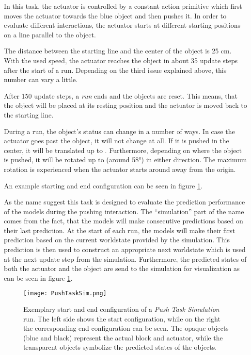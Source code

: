 In this task, the actuator is controlled by a constant action primitive which first moves the actuator towards the blue object and then pushes it.
In order to evaluate different interactions, the actuator starts at different starting positions on a line parallel to the object. 

The distance between the starting line and the center of the object is 25 cm. With the used speed, the actuator reaches the object in about 35 update steps after the start of a run. Depending on the third issue explained above, this number can vary a little.

After 150 update steps, a \textit{run} ends and the objects are reset. This means, that the object will be placed at its resting position and the actuator is moved back to the starting line. 

During a run, the object's status can change in a number of ways. In case the actuator goes past the object, it will not change at all. If it is pushed in the center, it will be translated up to . Furthermore, depending on where the object is pushed, it will be rotated up to  (around 58°) in either direction. 
The maximum rotation is experienced when the actuator starts around  away from the origin.

An example starting and end configuration can be seen in figure \ref{fig:pushTaskSim}. 

As the name suggest this task is designed to evaluate the prediction performance of the models during the pushing interaction. The \enquote{simulation} part of the name comes from the fact, that the models will make consecutive predictions based on their last prediction. At the start of each run, the models will make their first prediction based on the current worldstate provided by the simulation. This prediction is then used to construct an appropriate next worldstate which is used at the next update step from the simulation.
Furthermore, the predicted states of both the actuator and the object are send to the simulation for visualization as can be seen in figure \ref{fig:pushTaskSim}.

\begin{figure}
	\centering
	\texttt{[image: PushTaskSim.png]}
	\caption{Exemplary start and end configuration of a \textit{Push Task Simulation} run. The left side shows the start configuration, while on the right the corresponding end configuration can be seen.
		The opaque objects (blue and black) represent the actual block and actuator, while the transparent objects symbolize the predicted states of the objects.}
	\label{fig:pushTaskSim}
\end{figure}

